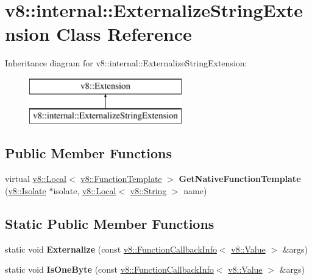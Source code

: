 \hypertarget{classv8_1_1internal_1_1_externalize_string_extension}{}\section{v8\+:\+:internal\+:\+:Externalize\+String\+Extension Class Reference}
\label{classv8_1_1internal_1_1_externalize_string_extension}
Inheritance diagram for v8\+:\+:internal\+:\+:Externalize\+String\+Extension\+:\begin{figure}[H]
\begin{center}
\leavevmode
\includegraphics[height=2.000000cm]{classv8_1_1internal_1_1_externalize_string_extension}
\end{center}
\end{figure}
\subsection*{Public Member Functions}
\begin{DoxyCompactItemize}
\item 
virtual \hyperlink{classv8_1_1_local}{v8\+::\+Local}$<$ \hyperlink{classv8_1_1_function_template}{v8\+::\+Function\+Template} $>$ {\bfseries Get\+Native\+Function\+Template} (\hyperlink{classv8_1_1_isolate}{v8\+::\+Isolate} $\ast$isolate, \hyperlink{classv8_1_1_local}{v8\+::\+Local}$<$ \hyperlink{classv8_1_1_string}{v8\+::\+String} $>$ name)\hypertarget{classv8_1_1internal_1_1_externalize_string_extension_ac9496952cfc355adb0ccbde07fdd3379}{}\label{classv8_1_1internal_1_1_externalize_string_extension_ac9496952cfc355adb0ccbde07fdd3379}

\end{DoxyCompactItemize}
\subsection*{Static Public Member Functions}
\begin{DoxyCompactItemize}
\item 
static void {\bfseries Externalize} (const \hyperlink{classv8_1_1_function_callback_info}{v8\+::\+Function\+Callback\+Info}$<$ \hyperlink{classv8_1_1_value}{v8\+::\+Value} $>$ \&args)\hypertarget{classv8_1_1internal_1_1_externalize_string_extension_ab6860f3c06f65fc49de65ef44a0006e0}{}\label{classv8_1_1internal_1_1_externalize_string_extension_ab6860f3c06f65fc49de65ef44a0006e0}

\item 
static void {\bfseries Is\+One\+Byte} (const \hyperlink{classv8_1_1_function_callback_info}{v8\+::\+Function\+Callback\+Info}$<$ \hyperlink{classv8_1_1_value}{v8\+::\+Value} $>$ \&args)\hypertarget{classv8_1_1internal_1_1_externalize_string_extension_a379a483fb71100d7ce95094e25427076}{}\label{classv8_1_1internal_1_1_externalize_string_extension_a379a483fb71100d7ce95094e25427076}

\end{DoxyCompactItemize}
